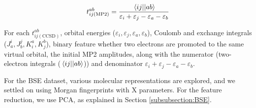 \documentclass[journal=jacsat,manuscript=article]{achemso}
\begin{document}
\begin{equation}
	t^{ab}_{ij(\text{MP2})} = \frac{\mel{ij}{}{ab}}{\varepsilon_{i}+\varepsilon_{j}-\varepsilon_{a}-\varepsilon_{b}}
	\label{eq:MP2_t2}
\end{equation}

For each $t^{ab}_{ij(\text{CCSD})}$, orbital energies ($\varepsilon_{i},\varepsilon_{j},\varepsilon_{a},\varepsilon_{b}$), Coulomb and exchange integrals ($J^{i}_{a},J^{j}_{b},K^{a}_{i},K^{b}_{j}$), binary feature whether two electrons are promoted to the same virtual orbital, the initial MP2 amplitudes, along with the numerator (two-electron integrals ($\mel{ij}{}{ab}$)) and denominator $\varepsilon_{i}+\varepsilon_{j}-\varepsilon_{a}-\varepsilon_{b}$.



For the BSE dataset, various molecular representations are explored, and we settled on using Morgan fingerprints with X parameters. 
For the feature reduction, we use PCA, as explained in Section \ref{subsubsection:BSE}.




\end{document}
